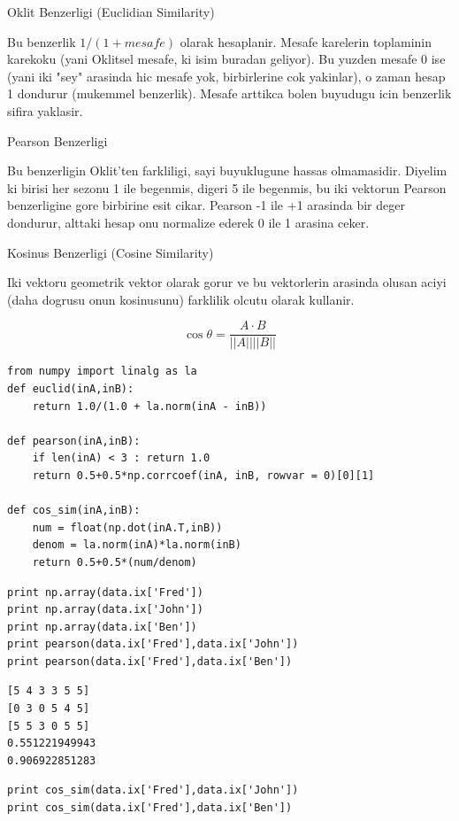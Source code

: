 \documentclass[12pt,fleqn]{article}\usepackage{../common}
\begin{document}
Oklit Benzerligi (Euclidian Similarity)

Bu benzerlik $1 / (1+mesafe)$ olarak hesaplanir. Mesafe karelerin
toplaminin karekoku (yani Oklitsel mesafe, ki isim buradan
geliyor). Bu yuzden mesafe 0 ise (yani iki "sey" arasinda hic mesafe
yok, birbirlerine cok yakinlar), o zaman hesap 1 dondurur (mukemmel
benzerlik). Mesafe arttikca bolen buyudugu icin benzerlik sifira yaklasir. 

Pearson Benzerligi

Bu benzerligin Oklit'ten farkliligi, sayi buyuklugune hassas
olmamasidir.  Diyelim ki birisi her sezonu 1 ile begenmis, digeri 5
ile begenmis, bu iki vektorun Pearson benzerligine gore birbirine esit
cikar. Pearson -1 ile +1 arasinda bir deger dondurur, alttaki hesap onu
normalize ederek 0 ile 1 arasina ceker.

Kosinus Benzerligi (Cosine Similarity)

Iki vektoru geometrik vektor olarak gorur ve bu vektorlerin arasinda
olusan aciyi (daha dogrusu onun kosinusunu) farklilik olcutu olarak
kullanir.

$$
\cos\theta = \frac{A \cdot B}{||A||||B||}
$$

\begin{verbatim}
from numpy import linalg as la
def euclid(inA,inB):
    return 1.0/(1.0 + la.norm(inA - inB))

def pearson(inA,inB):
    if len(inA) < 3 : return 1.0
    return 0.5+0.5*np.corrcoef(inA, inB, rowvar = 0)[0][1]

def cos_sim(inA,inB):
    num = float(np.dot(inA.T,inB))
    denom = la.norm(inA)*la.norm(inB)
    return 0.5+0.5*(num/denom)
\end{verbatim}

\begin{verbatim}
print np.array(data.ix['Fred'])
print np.array(data.ix['John'])
print np.array(data.ix['Ben'])
print pearson(data.ix['Fred'],data.ix['John'])
print pearson(data.ix['Fred'],data.ix['Ben'])
\end{verbatim}

\begin{verbatim}
[5 4 3 3 5 5]
[0 3 0 5 4 5]
[5 5 3 0 5 5]
0.551221949943
0.906922851283
\end{verbatim}

\begin{verbatim}
print cos_sim(data.ix['Fred'],data.ix['John'])
print cos_sim(data.ix['Fred'],data.ix['Ben'])
\end{verbatim}
\end{document}
